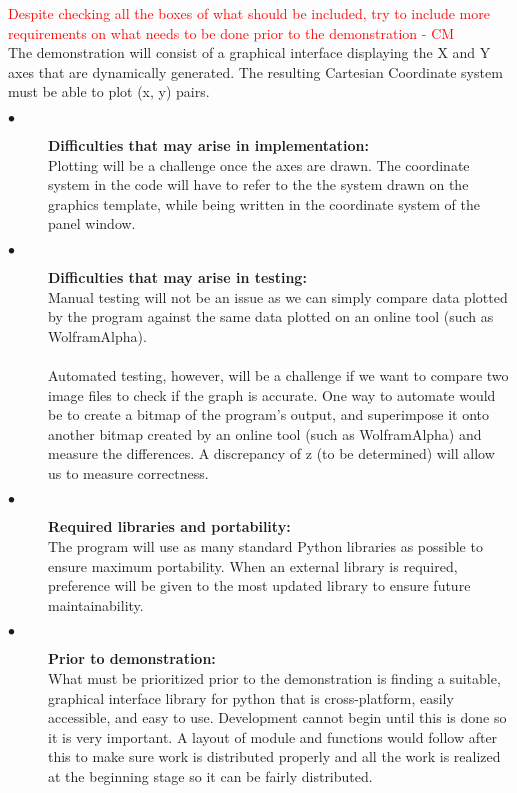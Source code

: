 \documentclass{article}
\begin{document}
\textcolor{red}{Despite checking all the boxes of what should be included, try to include more requirements on what needs to be done prior to the demonstration - CM} \\
The demonstration will consist of a graphical interface displaying the X and Y axes that are dynamically generated. The resulting Cartesian Coordinate system must be able to plot (x, y) pairs. 
\begin{description}
  \item[$\bullet$]  \textbf{Difficulties that may arise in implementation:} \\
  	Plotting will be a challenge once the axes are drawn. The coordinate system in the code will have to refer to the the system drawn on the graphics template, while being written in the coordinate system of the panel window. 

\item[$\bullet$]  \textbf{Difficulties that may arise in testing:} \\
Manual testing will not be an issue as we can simply compare data plotted by the program against the same data plotted on an online tool (such as WolframAlpha).\\ \\
Automated testing, however, will be a challenge if we want to compare two image files to check if the graph is accurate. One way to automate would be to create a bitmap of the program's output, and superimpose it onto another bitmap created by an online tool (such as WolframAlpha) and measure the differences. A discrepancy of z (to be determined) will allow us to measure correctness. 

\item[$\bullet$]  \textbf{Required libraries and portability:} \\
The program will use as many standard Python libraries as possible to ensure maximum portability. When an external library is required, preference will be given to the most updated library to ensure future maintainability. 

\item[$\bullet$]  \textbf{Prior to demonstration:} \\
What must be prioritized prior to the demonstration is finding a suitable, graphical interface library for python that is cross-platform, easily accessible, and easy to use. Development cannot begin until this is done so it is very important. A layout of module and functions would follow after this to make sure work is distributed properly and all the work is realized at the beginning stage so it can be fairly distributed.

\end{description}
\end{document}
